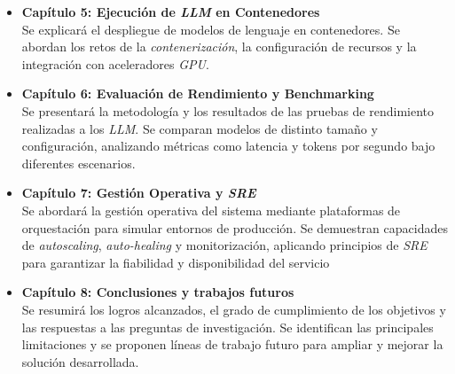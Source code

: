 \begin{itemize}
    \item \textbf{Capítulo 5: Ejecución de \textit{LLM} en Contenedores}\\
    Se explicará el despliegue de modelos de lenguaje en contenedores. Se abordan los retos de la \textit{contenerización}, la configuración de recursos y la integración con aceleradores \textit{GPU}.
    \item \textbf{Capítulo 6: Evaluación de Rendimiento y Benchmarking}\\
    Se presentará la metodología y los resultados de las pruebas de rendimiento realizadas a los \textit{LLM}. Se comparan modelos de distinto tamaño y configuración, analizando métricas como latencia y tokens por segundo bajo diferentes escenarios.
    \item \textbf{Capítulo 7: Gestión Operativa y \textit{SRE}}\\
    Se abordará la gestión operativa del sistema mediante plataformas de orquestación para simular entornos de producción. Se demuestran capacidades de \textit{autoscaling}, \textit{auto-healing} y monitorización, aplicando principios de \textit{SRE} para garantizar la fiabilidad y disponibilidad del servicio
    \item \textbf{Capítulo 8: Conclusiones y trabajos futuros}\\
    Se resumirá los logros alcanzados, el grado de cumplimiento de los objetivos y las respuestas a las preguntas de investigación. Se identifican las principales limitaciones y se proponen líneas de trabajo futuro para ampliar y mejorar la solución desarrollada.
\end{itemize}
